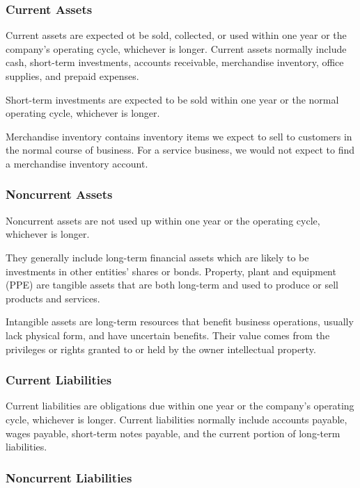\documentclass[../main.tex]{subfiles}
\begin{document}
	\subsubsection{Current Assets}
	
	Current assets are expected ot be sold, collected, or used within one year 
	or the company's operating cycle, whichever is longer. Current assets 
	normally include cash, short-term investments, accounts receivable, 
	merchandise inventory, office supplies, and prepaid expenses.
	
	Short-term investments are expected to be sold within one year or the 
	normal operating cycle, whichever is longer.
	
	Merchandise inventory contains inventory items we expect to sell to 
	customers in the normal course of business. For a service business, we 
	would not expect to find a merchandise inventory account. 
	
	\subsubsection{Noncurrent Assets}
	
	Noncurrent assets are not used up within one year or the operating cycle, 
	whichever is longer. 
	
	They generally include long-term financial assets which are likely to be 
	investments in other entities’ shares or bonds. Property, plant and 
	equipment (PPE) are tangible assets that are both long-term and used to 
	produce or sell products and services.
	
	Intangible assets are long-term resources that benefit business operations, 
	usually lack physical form, and have uncertain benefits. Their value comes 
	from the privileges or rights granted to or held by the owner \eg 
	intellectual property. 
	
	\subsubsection{Current Liabilities}
	
	Current liabilities are obligations due within one year or the company's 
	operating cycle, whichever is longer. Current liabilities normally include 
	accounts payable, wages payable, 
	short-term notes payable, and the current portion of long-term liabilities. 
	
	\subsubsection{Noncurrent Liabilities}
	
\end{document}
